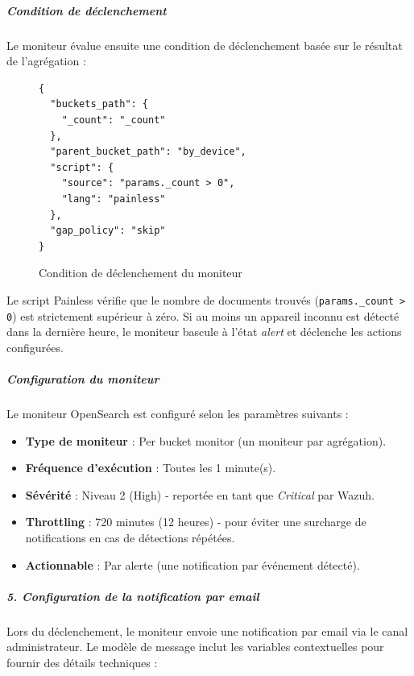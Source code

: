\documentclass[a4paper, 11pt]{article}
\begin{document}
\subparagraph{Condition de déclenchement}

Le moniteur évalue ensuite une condition de déclenchement basée sur le résultat de l'agrégation :

\begin{figure}[H]
  \centering
  \begin{minipage}{0.9\textwidth}
\begin{lstlisting}[language=wazuhXML]
{
  "buckets_path": {
    "_count": "_count"
  },
  "parent_bucket_path": "by_device",
  "script": {
    "source": "params._count > 0",
    "lang": "painless"
  },
  "gap_policy": "skip"
}
\end{lstlisting}
    \caption{Condition de déclenchement du moniteur}
    \label{fig:trigger_condition}
  \end{minipage}
\end{figure}

Le script Painless vérifie que le nombre de documents trouvés (\texttt{params.\_count > 0}) est strictement supérieur à zéro. Si au moins un appareil inconnu est détecté dans la dernière heure, le moniteur bascule à l'état \textit{alert} et déclenche les actions configurées.

\subparagraph{Configuration du moniteur}

Le moniteur OpenSearch est configuré selon les paramètres suivants :
\begin{itemize}
  \item[$\bullet$] \textbf{Type de moniteur} : Per bucket monitor (un moniteur par agrégation).
  \item[$\bullet$] \textbf{Fréquence d'exécution} : Toutes les 1 minute(s).
  \item[$\bullet$] \textbf{Sévérité} : Niveau 2 (High) - reportée en tant que \textit{Critical} par Wazuh.
  \item[$\bullet$] \textbf{Throttling} : 720 minutes (12 heures) - pour éviter une surcharge de notifications en cas de détections répétées.
  \item[$\bullet$] \textbf{Actionnable} : Par alerte (une notification par événement détecté).
\end{itemize}

\subparagraph{5. Configuration de la notification par email}

Lors du déclenchement, le moniteur envoie une notification par email via le canal administrateur. Le modèle de message inclut les variables contextuelles pour fournir des détails techniques :
\end{document}

